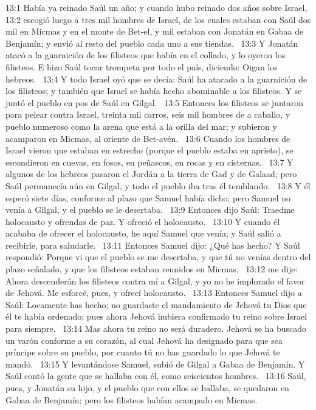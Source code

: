 13:1 Había ya reinado Saúl un año; y cuando hubo reinado dos años sobre Israel,  
13:2 escogió luego a tres mil hombres de Israel, de los cuales estaban con Saúl dos mil en Micmas y en el monte de Bet-el, y mil estaban con Jonatán en Gabaa de Benjamín; y envió al resto del pueblo cada uno a sus tiendas.  
13:3 Y Jonatán atacó a la guarnición de los filisteos que había en el collado, y lo oyeron los filisteos. E hizo Saúl tocar trompeta por todo el país, diciendo: Oigan los hebreos.  
13:4 Y todo Israel oyó que se decía: Saúl ha atacado a la guarnición de los filisteos; y también que Israel se había hecho abominable a los filisteos. Y se juntó el pueblo en pos de Saúl en Gilgal.  
13:5 Entonces los filisteos se juntaron para pelear contra Israel, treinta mil carros, seis mil hombres de a caballo, y pueblo numeroso como la arena que está a la orilla del mar; y subieron y acamparon en Micmas, al oriente de Bet-avén.  
13:6 Cuando los hombres de Israel vieron que estaban en estrecho (porque el pueblo estaba en aprieto), se escondieron en cuevas, en fosos, en peñascos, en rocas y en cisternas.  
13:7 Y algunos de los hebreos pasaron el Jordán a la tierra de Gad y de Galaad; pero Saúl permanecía aún en Gilgal, y todo el pueblo iba tras él temblando.  
13:8 Y él esperó siete días, conforme al plazo que Samuel había dicho; pero Samuel no venía a Gilgal, y el pueblo se le desertaba.  
13:9 Entonces dijo Saúl: Traedme holocausto y ofrendas de paz. Y ofreció el holocausto.  
13:10 Y cuando él acababa de ofrecer el holocausto, he aquí Samuel que venía; y Saúl salió a recibirle, para saludarle.  
13:11 Entonces Samuel dijo: ¿Qué has hecho? Y Saúl respondió: Porque vi que el pueblo se me desertaba, y que tú no venías dentro del plazo señalado, y que los filisteos estaban reunidos en Micmas,  
13:12 me dije: Ahora descenderán los filisteos contra mí a Gilgal, y yo no he implorado el favor de Jehová. Me esforcé, pues, y ofrecí holocausto.  
13:13 Entonces Samuel dijo a Saúl: Locamente has hecho; no guardaste el mandamiento de Jehová tu Dios que él te había ordenado; pues ahora Jehová hubiera confirmado tu reino sobre Israel para siempre.  
13:14 Mas ahora tu reino no será duradero. Jehová se ha buscado un varón conforme a su corazón, al cual Jehová ha designado para que sea príncipe sobre su pueblo, por cuanto tú no has guardado lo que Jehová te mandó.  
13:15 Y levantándose Samuel, subió de Gilgal a Gabaa de Benjamín. Y Saúl contó la gente que se hallaba con él, como seiscientos hombres.  
13:16 Saúl, pues, y Jonatán su hijo, y el pueblo que con ellos se hallaba, se quedaron en Gabaa de Benjamín; pero los filisteos habían acampado en Micmas.  
